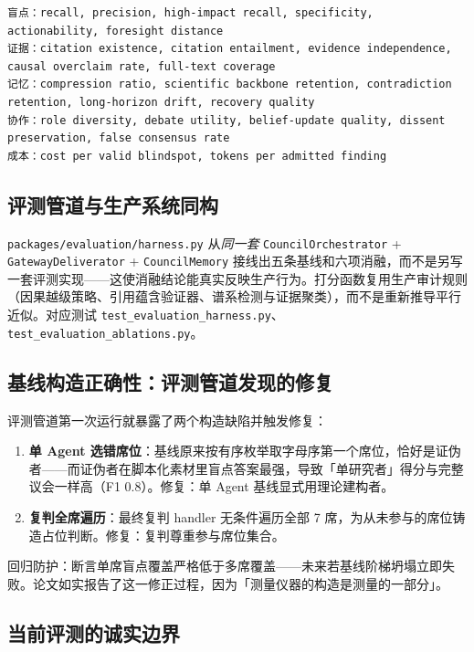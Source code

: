 \begin{lstlisting}
盲点：recall, precision, high-impact recall, specificity, actionability, foresight distance
证据：citation existence, citation entailment, evidence independence, causal overclaim rate, full-text coverage
记忆：compression ratio, scientific backbone retention, contradiction retention, long-horizon drift, recovery quality
协作：role diversity, debate utility, belief-update quality, dissent preservation, false consensus rate
成本：cost per valid blindspot, tokens per admitted finding
\end{lstlisting}

\subsection{评测管道与生产系统同构}

\texttt{packages/evaluation/harness.py} 从\emph{同一套} \texttt{CouncilOrchestrator} + \texttt{GatewayDeliverator} + \texttt{CouncilMemory} 接线出五条基线和六项消融，而不是另写一套评测实现——这使消融结论能真实反映生产行为。打分函数复用生产审计规则（因果越级策略、引用蕴含验证器、谱系检测与证据聚类），而不是重新推导平行近似。对应测试 \texttt{test\_evaluation\_harness.py}、\texttt{test\_evaluation\_ablations.py}。

\subsection{基线构造正确性：评测管道发现的修复}

评测管道第一次运行就暴露了两个构造缺陷并触发修复：

\begin{enumerate}
\item \textbf{单 Agent 选错席位}：基线原来按有序枚举取字母序第一个席位，恰好是证伪者——而证伪者在脚本化素材里盲点答案最强，导致「单研究者」得分与完整议会一样高（F1 0.8）。修复：单 Agent 基线显式用理论建构者。
\item \textbf{复判全席遍历}：最终复判 handler 无条件遍历全部 7 席，为从未参与的席位铸造占位判断。修复：复判尊重参与席位集合。
\end{enumerate}

回归防护：断言单席盲点覆盖严格低于多席覆盖——未来若基线阶梯坍塌立即失败。论文如实报告了这一修正过程，因为「测量仪器的构造是测量的一部分」。

\subsection{当前评测的诚实边界}

